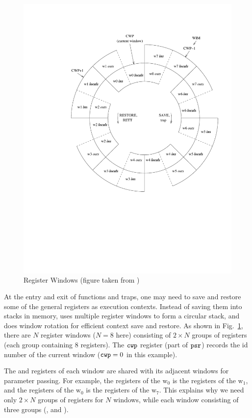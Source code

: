 \begin{figure}[!t]
	\centering
	\includegraphics[width=50ex]{window}
	\caption{Register Windows (figure taken from \cite{sparc})}
	\label{fig:RegisterWindows}
\end{figure}

At the entry and exit of functions and traps, one may need to
save and restore some of the general registers as execution
contexts. Instead of saving them into stacks in memory,
\sparc{} uses multiple register windows to form a circular
stack, and does window rotation for efficient context save and restore.
As shown in Fig.~\ref{fig:RegisterWindows}, there are $N$
register windows ($N=8$ here) consisting of $2\times N$
groups of registers (each group containing 8 registers).
The $\texttt{cwp}$ register (part of $\texttt{psr}$) records the id number
of the current window ($\texttt{cwp}=0$ in this example).

The \inRN{} and \outRN{} registers of each window are shared
with its adjacent windows for parameter passing.
For example, the \inRN{} registers of the $\text{w}_0$
is the \outRN{} registers of the $\text{w}_1$,
and the \outRN{} registers of the $\text{w}_0$
is the \inRN{} registers of the $\text{w}_7$.
This explains
why we need only $2\times N$ groups of registers for
$N$ windows, while each window consisting of
three groups (\outRN{}, \localRN{} and \inRN{}).


